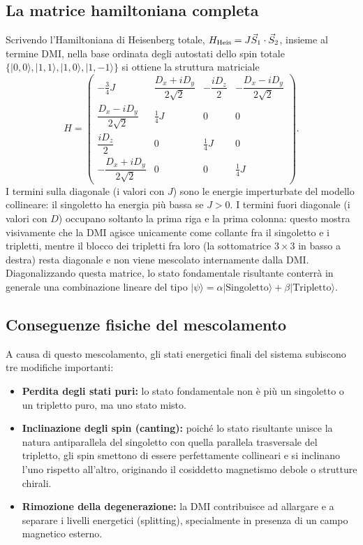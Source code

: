 \documentclass[11pt,a4paper]{article}
\begin{document}
\subsection{La matrice hamiltoniana completa}

Scrivendo l'Hamiltoniana di Heisenberg totale, $H_{\rm Heis}=J\vec S_1\cdot\vec S_2$,
insieme al termine DMI, nella base ordinata degli autostati dello spin totale
$\{|0,0\rangle,|1,1\rangle,|1,0\rangle,|1,-1\rangle\}$ si ottiene la struttura
matriciale
$$H = \begin{pmatrix}
-\frac34 J & \dfrac{D_x+iD_y}{2\sqrt2} & -\dfrac{iD_z}{2} & -\dfrac{D_x-iD_y}{2\sqrt2} \\[8pt]
\dfrac{D_x-iD_y}{2\sqrt2} & \frac14 J & 0 & 0 \\[6pt]
\dfrac{iD_z}{2} & 0 & \frac14 J & 0 \\[6pt]
-\dfrac{D_x+iD_y}{2\sqrt2} & 0 & 0 & \frac14 J
\end{pmatrix}.$$
I termini sulla diagonale (i valori con $J$) sono le energie imperturbate del modello
collineare: il singoletto ha energia pi\`u bassa se $J>0$. I termini fuori diagonale
(i valori con $D$) occupano soltanto la prima riga e la prima colonna: questo mostra
visivamente che la DMI agisce unicamente come collante fra il singoletto e i
tripletti, mentre il blocco dei tripletti fra loro (la sottomatrice $3\times3$ in
basso a destra) resta diagonale e non viene mescolato internamente dalla DMI.
Diagonalizzando questa matrice, lo stato fondamentale risultante conterr\`a in
generale una combinazione lineare del tipo $|\psi\rangle=\alpha|\text{Singoletto}\rangle+\beta|\text{Tripletto}\rangle$.

\subsection{Conseguenze fisiche del mescolamento}

A causa di questo mescolamento, gli stati energetici finali del sistema subiscono tre
modifiche importanti:
\begin{itemize}
\item \textbf{Perdita degli stati puri:} lo stato fondamentale non \`e pi\`u un
singoletto o un tripletto puro, ma uno stato misto.
\item \textbf{Inclinazione degli spin (canting):} poich\'e lo stato risultante unisce
la natura antiparallela del singoletto con quella parallela trasversale del
tripletto, gli spin smettono di essere perfettamente collineari e si inclinano l'uno
rispetto all'altro, originando il cosiddetto magnetismo debole o strutture chirali.
\item \textbf{Rimozione della degenerazione:} la DMI contribuisce ad allargare e a
separare i livelli energetici (splitting), specialmente in presenza di un campo
magnetico esterno.
\end{itemize}
\end{document}
